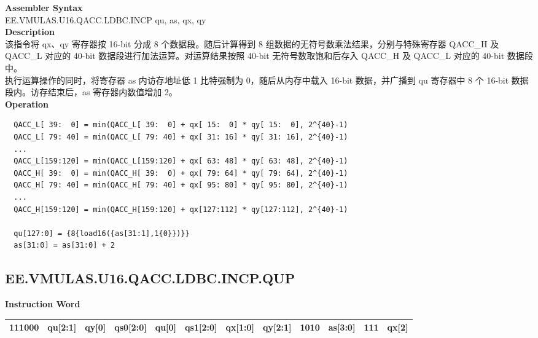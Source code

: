 \textbf{Assembler Syntax} \\
EE.VMULAS.U16.QACC.LDBC.INCP qu, as, qx, qy \\
\textbf{Description} \\
该指令将 qx、qy 寄存器按 16-bit 分成 8 个数据段。随后计算得到 8 组数据的无符号数乘法结果，分别与特殊寄存器 QACC\_H 及 QACC\_L 对应的 40-bit 数据段进行加法运算。对运算结果按照 40-bit 无符号数取饱和后存入 QACC\_H 及 QACC\_L 对应的 40-bit 数据段中。\\
执行运算操作的同时，将寄存器 as 内访存地址低 1 比特强制为 0，随后从内存中载入 16-bit 数据，并广播到 qu 寄存器中 8 个 16-bit 数据段内。访存结束后，as 寄存器内数值增加 2。\\
\textbf{Operation}
\begin{lstlisting}
  QACC_L[ 39:  0] = min(QACC_L[ 39:  0] + qx[ 15:  0] * qy[ 15:  0], 2^{40}-1)
  QACC_L[ 79: 40] = min(QACC_L[ 79: 40] + qx[ 31: 16] * qy[ 31: 16], 2^{40}-1)
  ...
  QACC_L[159:120] = min(QACC_L[159:120] + qx[ 63: 48] * qy[ 63: 48], 2^{40}-1)
  QACC_H[ 39:  0] = min(QACC_H[ 39:  0] + qx[ 79: 64] * qy[ 79: 64], 2^{40}-1)
  QACC_H[ 79: 40] = min(QACC_H[ 79: 40] + qx[ 95: 80] * qy[ 95: 80], 2^{40}-1)
  ...
  QACC_H[159:120] = min(QACC_H[159:120] + qx[127:112] * qy[127:112], 2^{40}-1)

  qu[127:0] = {8{load16({as[31:1],1{0}})}}
  as[31:0] = as[31:0] + 2
\end{lstlisting}

\clearpage
\subsection{EE.VMULAS.U16.QACC.LDBC.INCP.QUP}\label{instruction:EEVMULASU16QACCLDBCINCPQUP}
\setlength\tabcolsep{6pt}
\textbf{Instruction Word} \\
\begin{tabular}{|c|c|c|c|c|c|c|c|c|c|c|c|}
	\hline
	111000 & qu[2:1] & qy[0] & qs0[2:0] & qu[0] & qs1[2:0] & qx[1:0] & qy[2:1] & 1010 & as[3:0] & 111 & qx[2] \\
	\hline
\end{tabular}

